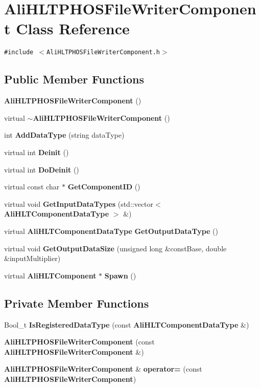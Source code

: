 \section{Ali\-HLTPHOSFile\-Writer\-Component Class Reference}
\label{classAliHLTPHOSFileWriterComponent}
{\tt \#include $<$Ali\-HLTPHOSFile\-Writer\-Component.h$>$}

\subsection*{Public Member Functions}
\begin{CompactItemize}
\item 
{\bf Ali\-HLTPHOSFile\-Writer\-Component} ()
\item 
virtual {\bf $\sim$Ali\-HLTPHOSFile\-Writer\-Component} ()
\item 
int {\bf Add\-Data\-Type} (string data\-Type)
\item 
virtual int {\bf Deinit} ()
\item 
virtual int {\bf Do\-Deinit} ()
\item 
virtual const char $\ast$ {\bf Get\-Component\-ID} ()
\item 
virtual void {\bf Get\-Input\-Data\-Types} (std::vector$<$ {\bf Ali\-HLTComponent\-Data\-Type} $>$ \&)
\item 
virtual {\bf Ali\-HLTComponent\-Data\-Type} {\bf Get\-Output\-Data\-Type} ()
\item 
virtual void {\bf Get\-Output\-Data\-Size} (unsigned long \&const\-Base, double \&input\-Multiplier)
\item 
virtual {\bf Ali\-HLTComponent} $\ast$ {\bf Spawn} ()
\end{CompactItemize}
\subsection*{Private Member Functions}
\begin{CompactItemize}
\item 
Bool\_\-t {\bf Is\-Registered\-Data\-Type} (const {\bf Ali\-HLTComponent\-Data\-Type} \&)
\item 
{\bf Ali\-HLTPHOSFile\-Writer\-Component} (const {\bf Ali\-HLTPHOSFile\-Writer\-Component} \&)
\item 
{\bf Ali\-HLTPHOSFile\-Writer\-Component} \& {\bf operator=} (const {\bf Ali\-HLTPHOSFile\-Writer\-Component})
\end{CompactItemize}
